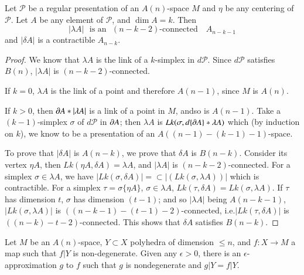 \begin{proposition}\label{chap5-prop5.3.6}
Let $\mathscr{P}$ be a regular presentation of an $A(n)$-space $M$ and $\eta$ be any centering of $\mathscr{P}$. Let $A$ be any element of $\mathscr{P}$, and $\dim A=k$. Then
$$
|\lambda A|\text{~ is an~ }(n-k-2)\text{-connected}\quad A_{n-k-1}
$$
and $|\delta A|$ is a contractible $A_{n-k}$.
\end{proposition}

\begin{proof}
We know that $\lambda A$ is the link of a $k$-simplex in $d\mathscr{P}$. Since $d\mathscr{P}$ satisfies $B(n)$, $|\lambda A|$ is $(n-k-2)$-connected.

If $k=0$, $\lambda A$ is the link of a point and therefore $A(n-1)$, since $M$ is $A(n)$. 

If $k>0$, then $\partial A\ast |\lambda A|$ is a link of a point in $M$, and\pageoriginale so is $A(n-1)$. Take a $(k-1)$-simplex $\sigma$ of $d\mathscr{P}$ in $\partial A$; then $\lambda A$ is $Lk(\sigma,d\{\partial A\}\ast\lambda A)$ which (by induction on $k$), we know to be a presentation of an $A((n-1)-(k-1)-1)$-space.

To prove that $|\delta A|$ is $A(n-k)$, we prove that $\delta A$ is $B(n-k)$. Consider its vertex $\eta A$, then $Lk(\eta A,\delta A)=\lambda A$, and $|\lambda A|$ is $(n-k-2)$-connected. For a simplex $\sigma \in \lambda A$, we have $|Lk(\sigma,\delta A)|=\subset |(Lk(\sigma,\lambda A))|$ which is contractible. For a simplex $\tau=\sigma\{\eta A\}$, $\sigma\in \lambda A$, $Lk(\tau,\delta A)=Lk(\sigma,\lambda A)$. If $\tau$ has dimension $t$, $\sigma$ has dimension $(t-1)$; and so $|\lambda A|$ being $A(n-k-1)$, $|Lk(\sigma,\lambda A)|$ is $((n-k-1)-(t-1)-2)$-connected, i.e.\@ $|Lk(\tau,\delta A)|$ is $((n-k)-t-2)$-connected. This shows that $\delta A$ satisfies $B(n-k)$.
\end{proof}

\begin{theorem}\label{chap5-thm5.3.7}
Let $M$ be an $A(n)$-space, $Y\subset X$ polyhedra of dimension $\leq n$, and $f:X\to M$ a map such that $f|Y$ is non-degenerate. Given any $\epsilon>0$, there is an $\epsilon$-approximation $g$ to $f$ such that $g$ is nondegenerate and $g|Y=f|Y$. 
\end{theorem}


